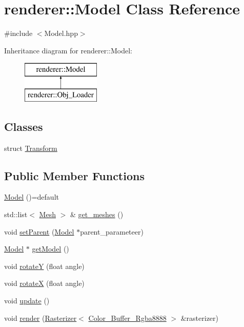 \hypertarget{classrenderer_1_1_model}{}\section{renderer\+::Model Class Reference}
\label{classrenderer_1_1_model}


{\ttfamily \#include $<$Model.\+hpp$>$}

Inheritance diagram for renderer\+::Model\+:\begin{figure}[H]
\begin{center}
\leavevmode
\includegraphics[height=2.000000cm]{classrenderer_1_1_model}
\end{center}
\end{figure}
\subsection*{Classes}
\begin{DoxyCompactItemize}
\item 
struct \mbox{\hyperlink{structrenderer_1_1_model_1_1_transform}{Transform}}
\end{DoxyCompactItemize}
\subsection*{Public Member Functions}
\begin{DoxyCompactItemize}
\item 
\mbox{\hyperlink{classrenderer_1_1_model_aa34808094210c07af4ab1aba76cf89f6}{Model}} ()=default
\item 
std\+::list$<$ \mbox{\hyperlink{classrenderer_1_1_mesh}{Mesh}} $>$ \& \mbox{\hyperlink{classrenderer_1_1_model_a88df819cc280f518023364c9181aff64}{get\+\_\+meshes}} ()
\item 
void \mbox{\hyperlink{classrenderer_1_1_model_a47dd52d773bbcde8c2eceb704e904e4b}{set\+Parent}} (\mbox{\hyperlink{classrenderer_1_1_model}{Model}} $\ast$parent\+\_\+parameteer)
\item 
\mbox{\hyperlink{classrenderer_1_1_model}{Model}} $\ast$ \mbox{\hyperlink{classrenderer_1_1_model_a2e81d98304670f47465b18010ec342cb}{get\+Model}} ()
\item 
void \mbox{\hyperlink{classrenderer_1_1_model_af7da088f74cd608807beff747801f035}{rotateY}} (float angle)
\item 
void \mbox{\hyperlink{classrenderer_1_1_model_ab9f8435be21c68241138f3ccea924ad8}{rotateX}} (float angle)
\item 
void \mbox{\hyperlink{classrenderer_1_1_model_a7773b13f4cd297edf1d11788066eb510}{update}} ()
\item 
void \mbox{\hyperlink{classrenderer_1_1_model_aa244954142032d5aaed2d17585fe6a91}{render}} (\mbox{\hyperlink{classrenderer_1_1_rasterizer}{Rasterizer}}$<$ \mbox{\hyperlink{classrenderer_1_1_color___buffer___rgba8888}{Color\+\_\+\+Buffer\+\_\+\+Rgba8888}} $>$ \&rasterizer)
\end{DoxyCompactItemize}
